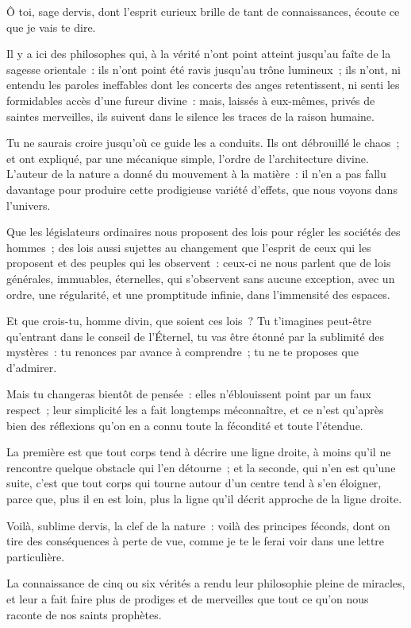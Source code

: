 \documentclass[french,twoside]{book} %
\begin{document}
\noindent Ô toi, sage dervis, dont l’esprit curieux brille de tant de connaissances, écoute ce que je vais te dire.\par
Il y a ici des philosophes qui, à la vérité n’ont point atteint jusqu’au faîte de la sagesse orientale : ils n’ont point été ravis jusqu’au trône lumineux ; ils n’ont, ni entendu les paroles ineffables dont les concerts des anges retentissent, ni senti les formidables accès d’une fureur divine : mais, laissés à eux-mêmes, privés de saintes merveilles, ils suivent dans le silence les traces de la raison humaine.\par
Tu ne saurais croire jusqu’où ce guide les a conduits. Ils ont débrouillé le chaos ; et ont expliqué, par une mécanique simple, l’ordre de l’architecture divine. L’auteur de la nature a donné du mouvement à la matière : il n’en a pas fallu davantage pour produire cette prodigieuse variété d’effets, que nous voyons dans l’univers.\par
Que les législateurs ordinaires nous proposent des lois pour régler les sociétés des hommes ; des lois aussi sujettes au changement que l’esprit de ceux qui les proposent et des peuples qui les observent : ceux-ci ne nous parlent que de lois générales, immuables, éternelles, qui s’observent sans aucune exception, avec un ordre, une régularité, et une promptitude infinie, dans l’immensité des espaces.\par
Et que crois-tu, homme divin, que soient ces lois ? Tu t’imagines peut-être qu’entrant dans le conseil de l’Éternel, tu vas être étonné par la sublimité des mystères : tu renonces par avance à comprendre ; tu ne te proposes que d’admirer.\par
Mais tu changeras bientôt de pensée : elles n’éblouissent point par un faux respect ; leur simplicité les a fait longtemps méconnaître, et ce n’est qu’après bien des réflexions qu’on en a connu toute la fécondité et toute l’étendue.\par
La première est que tout corps tend à décrire une ligne droite, à moins qu’il ne rencontre quelque obstacle qui l’en détourne ; et la seconde, qui n’en est qu’une suite, c’est que tout corps qui tourne autour d’un centre tend à s’en éloigner, parce que, plus il en est loin, plus la ligne qu’il décrit approche de la ligne droite.\par
Voilà, sublime dervis, la clef de la nature : voilà des principes féconds, dont on tire des conséquences à perte de vue, comme je te le ferai voir dans une lettre particulière.\par
La connaissance de cinq ou six vérités a rendu leur philosophie pleine de miracles, et leur a fait faire plus de prodiges et de merveilles que tout ce qu’on nous raconte de nos saints prophètes.\par
\end{document}
